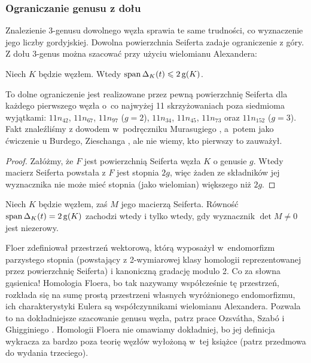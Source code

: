 %

\subsubsection{Ograniczanie genusu z dołu}
Znalezienie 3-genusu dowolnego węzła sprawia te same trudności, co wyznaczenie jego liczby gordyjskiej.
Dowolna powierzchnia Seiferta zadaje ograniczenie z góry.
Z dołu 3-genus można szacować przy użyciu wielomianu Alexandera:
%

\begin{proposition}
\label{prp:alexander_genus}%
    Niech $K$ będzie węzłem.
    Wtedy $\operatorname{span} \Delta_K(t) \leqslant 2\operatorname{g}(K)$.
\end{proposition}

To dolne ograniczenie jest realizowane przez pewną powierzchnię Seiferta dla każdego pierwszego węzła o~co najwyżej 11 skrzyżowaniach poza siedmioma wyjątkami: $11n_{42}$, $11n_{67}$, $11n_{97}$ ($g = 2$), $11n_{34}$, $11n_{45}$, $11n_{73}$ oraz $11n_{152}$ ($g = 3$).
Fakt znaleźliśmy z dowodem w~podręczniku Murasugiego \cite[s. 121]{murasugi1996}, a~potem jako ćwiczenie u Burdego, Zieschanga \cite[s. 137]{burde2014}, ale nie wiemy, kto pierwszy to zauważył.

\begin{proof}
    Załóżmy, że $F$ jest powierzchnią Seiferta węzła $K$ o genusie $g$.
    Wtedy macierz Seiferta powstała z $F$ jest stopnia $2g$, więc żaden ze składników jej wyznacznika nie może mieć stopnia (jako wielomian) większego niż $2g$.
\end{proof}

\begin{proposition}
    Niech $K$ będzie węzłem, zaś $M$ jego macierzą Seiferta.
    Równość $\operatorname{span} \Delta_K(t) = 2\operatorname{g}(K)$ zachodzi wtedy i tylko wtedy, gdy wyznacznik $\det M \neq 0$ jest niezerowy.
\end{proposition}

Floer \cite{floer1990} zdefiniował przestrzeń wektorową, którą wyposażył w~endomorfizm parzystego stopnia (powstający z 2-wymiarowej klasy homologii reprezentowanej przez powierzchnię Seiferta) i kanoniczną gradację modulo 2.
Co za słowna gąsienica!
%
Homologia Floera, bo tak nazywamy współcześnie tę przestrzeń, rozkłada się na sumę prostą przestrzeni własnych wyróżnionego endomorfizmu, ich charakterystyki Eulera są współczynnikami wielomianu Alexandera.
Pozwala to na dokładniejsze szacowanie genusu węzła, patrz prace Ozsvátha, Szabó \cite{szabo2003} i Ghigginiego \cite{ghiggini2008}.
%
%
%
Homologii Floera nie omawiamy dokładniej, bo jej definicja wykracza za bardzo poza teorię węzłów wyłożoną w~tej książce (patrz przedmowa do wydania trzeciego).

%